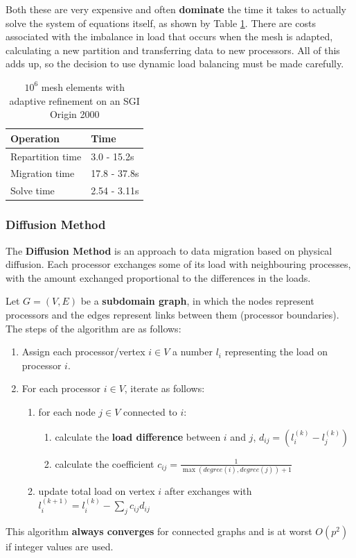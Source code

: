 \documentclass{article}
\begin{document}
Both these are very expensive and often \textbf{dominate} the time it takes to actually solve the system of equations itself, as shown by Table \ref{tab:dynamic-load-balancing-costs}. There are costs associated with the imbalance in load that occurs when the mesh is adapted, calculating a new partition and transferring data to new processors. All of this adds up, so the decision to use dynamic load balancing must be made carefully.

\begin{table}
	\centering
	\begin{tabular}{|l|l|}
		\hline
		\textbf{Operation} & \textbf{Time} \\
		\hline
		Repartition time & 3.0 - 15.2s \\
		Migration time & 17.8 - 37.8s \\
		Solve time & 2.54 - 3.11s \\
		\hline
	\end{tabular}
	\caption{$10^6$ mesh elements with adaptive refinement on an SGI Origin 2000}
	\label{tab:dynamic-load-balancing-costs}
\end{table}

\subsubsection{Diffusion Method}

The \textbf{Diffusion Method} is an approach to data migration based on physical diffusion. Each processor exchanges some of its load with neighbouring processes, with the amount exchanged proportional to the differences in the loads.

Let $G = (V, E)$ be a \textbf{subdomain graph}, in which the nodes represent processors and the edges represent links between them (processor boundaries). The steps of the algorithm are as follows:
\begin{enumerate}
	\item Assign each processor/vertex $i \in V$ a number $l_i$ representing the load on processor $i$.
	 \item For each processor $i \in V$, iterate as follows:
	 \begin{enumerate}
	 	\item for each node $j \in V$ connected to $i$:
	 		\begin{enumerate}
	 			\item calculate the \textbf{load difference} between $i$ and $j$, $d_{ij} = (l_i^{(k)} - l_j^{(k)})$
	 			\item calculate the coefficient $c_{ij} = \frac{1}{\max (degree(i), degree(j)) + 1}$
	 		\end{enumerate}
	 	\item update total load on vertex $i$ after exchanges with $l_i^{(k+1)} = l_i^{(k)} - \sum_j {c_{ij}d_{ij}}$
	 \end{enumerate}
\end{enumerate}
This algorithm \textbf{always converges} for connected graphs and is at worst $O(p^2)$ if integer values are used.
\end{document}
